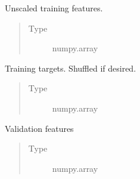 \documentclass[letterpaper,10pt,english]{sphinxmanual}
\begin{document}
\begin{fulllineitems}
\begin{fulllineitems}
\begin{quote}
\begin{description}
\end{description}\end{quote}

\end{fulllineitems}


\begin{fulllineitems}
\label{\detokenize{api/ucf.TrainingDataSets:ucf.TrainingDataSets.train_features}}
Unscaled training features.
\begin{quote}\begin{description}
\item[{Type}] \leavevmode
numpy.array

\end{description}\end{quote}

\end{fulllineitems}


\begin{fulllineitems}
\label{\detokenize{api/ucf.TrainingDataSets:ucf.TrainingDataSets.train_targets}}
Training targets. Shuffled if desired.
\begin{quote}\begin{description}
\item[{Type}] \leavevmode
numpy.array

\end{description}\end{quote}

\end{fulllineitems}


\begin{fulllineitems}
\label{\detokenize{api/ucf.TrainingDataSets:ucf.TrainingDataSets.validation_features}}
Validation features
\begin{quote}\begin{description}
\item[{Type}] \leavevmode
numpy.array


\end{description}
\end{quote}
\end{fulllineitems}
\end{fulllineitems}
\end{document}
